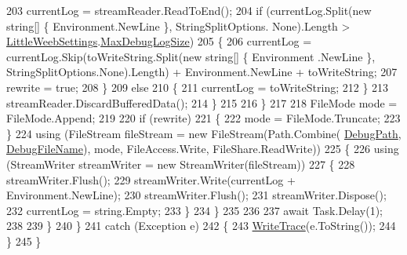 \begin{DoxyCode}
203                             currentLog = streamReader.ReadToEnd();
204                             \textcolor{keywordflow}{if} (currentLog.Split(\textcolor{keyword}{new} \textcolor{keywordtype}{string}[] \{ Environment.NewLine \}, StringSplitOptions.
      None).Length > \mbox{\hyperlink{class_little_weeb_library_1_1_settings_1_1_little_weeb_settings}{LittleWeebSettings}}.\mbox{\hyperlink{class_little_weeb_library_1_1_settings_1_1_little_weeb_settings_aed66354aaf455ab77c7360074cb05a2d}{MaxDebugLogSize}})
205                             \{
206                                 currentLog = currentLog.Skip(toWriteString.Split(\textcolor{keyword}{new} \textcolor{keywordtype}{string}[] \{ Environment
      .NewLine \}, StringSplitOptions.None).Length) + Environment.NewLine + toWriteString;
207                                 rewrite = \textcolor{keyword}{true};
208                             \}
209                             \textcolor{keywordflow}{else}
210                             \{
211                                 currentLog = toWriteString;
212                             \}
213                             streamReader.DiscardBufferedData();
214                         \}
215                       
216                     \}
217 
218                     FileMode mode = FileMode.Append;
219 
220                     \textcolor{keywordflow}{if} (rewrite)
221                     \{
222                         mode = FileMode.Truncate;
223                     \}
224                     \textcolor{keyword}{using} (FileStream fileStream = \textcolor{keyword}{new} FileStream(Path.Combine(
      \mbox{\hyperlink{class_little_weeb_library_1_1_handlers_1_1_debug_handler_ac3da0e592d7c056dfeb8e60a5a5c1986}{DebugPath}}, \mbox{\hyperlink{class_little_weeb_library_1_1_handlers_1_1_debug_handler_ac6690e0052ce2a2a040a5160c60fa6d4}{DebugFileName}}), mode, FileAccess.Write, FileShare.ReadWrite))
225                     \{
226                         \textcolor{keyword}{using} (StreamWriter streamWriter = \textcolor{keyword}{new} StreamWriter(fileStream))
227                         \{
228                             streamWriter.Flush();
229                             streamWriter.Write(currentLog + Environment.NewLine);
230                             streamWriter.Flush();
231                             streamWriter.Dispose();
232                             currentLog = \textcolor{keywordtype}{string}.Empty;
233                         \}
234                     \}
235 
236 
237                     await Task.Delay(1);
238 
239                 \}
240             \}
241             \textcolor{keywordflow}{catch} (Exception e)
242             \{
243                 \mbox{\hyperlink{class_little_weeb_library_1_1_handlers_1_1_debug_handler_ade74885424ad635ba119c8c146bd7e73}{WriteTrace}}(e.ToString());
244             \}        
245         \}
\end{DoxyCode}
